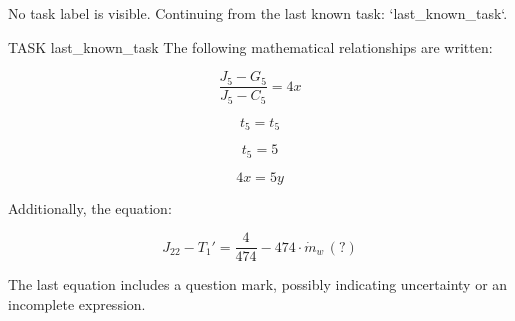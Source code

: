 No task label is visible. Continuing from the last known task: `{last_known_task}`.

TASK {last_known_task}
The following mathematical relationships are written:

\[
\frac{J_5 - G_5}{J_5 - C_5} = 4x
\]

\[
t_5 = t_5
\]

\[
t_5 = 5
\]

\[
4x = 5y
\]

Additionally, the equation:

\[
J_{22} - T_1' = \frac{4}{474} - 474 \cdot \dot{m}_w \, (?)
\]

The last equation includes a question mark, possibly indicating uncertainty or an incomplete expression.